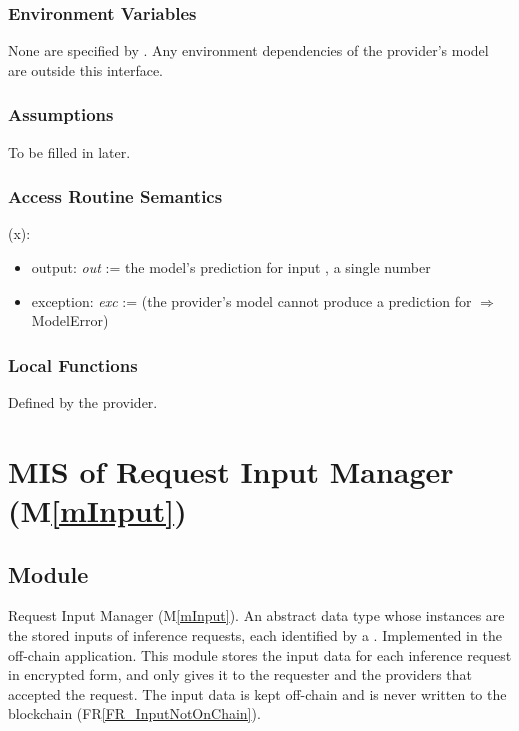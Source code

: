 \documentclass[12pt, titlepage]{article}
\newcommand{\mref}[1]{M\ref{#1}}
\newcommand{\rref}[1]{FR\ref{#1}}
\let\unbreakabletexttt\texttt
\renewcommand{\texttt}[1]{\unbreakabletexttt{\seqsplit{#1}}}
\begin{document}
\subsubsection{Environment Variables}

None are specified by \progname{}. Any environment dependencies of the
provider's model are outside this interface.

\subsubsection{Assumptions}

To be filled in later.

\subsubsection{Access Routine Semantics}

\noindent \texttt{predict}(x):
\begin{itemize}
\item output: \textit{out} := the model's prediction for input \texttt{x}, a
  single number
\item exception: \textit{exc} := (the provider's model cannot produce a
  prediction for \texttt{x} $\Rightarrow$ ModelError)
\end{itemize}

\subsubsection{Local Functions}

Defined by the provider.

\newpage

\section{MIS of Request Input Manager (\mref{mInput})} \label{misInput}

\subsection{Module}

Request Input Manager (\mref{mInput}). An abstract data type whose instances are
the stored inputs of inference requests, each identified by a
\texttt{RequestId}. Implemented in the off-chain application. This module
stores the input data for each inference request in encrypted form, and only
gives it to the requester and the providers that accepted the request. The
input data is kept off-chain and is never written to the blockchain
(\rref{FR_InputNotOnChain}).
\end{document}
